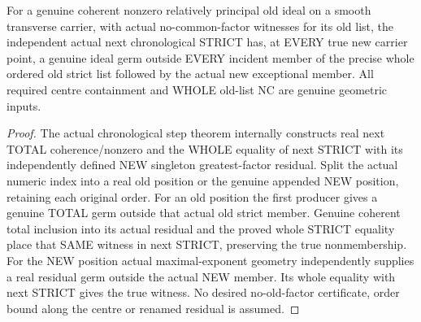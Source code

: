 \begin{theorem}
\label{hir:sharp-actual-next-strict-no-accumulated-member-factor}
\leanok
For a genuine coherent nonzero relatively principal old ideal on a smooth
transverse carrier, with actual no-common-factor witnesses for its old list,
the independent actual next chronological STRICT has, at EVERY true new
carrier point, a genuine ideal germ outside EVERY incident member of the
precise whole ordered old strict list followed by the actual new exceptional
member. All required centre containment and WHOLE old-list NC are genuine
geometric inputs.
\end{theorem}
\begin{proof}
The actual chronological step theorem internally constructs real next TOTAL
coherence/nonzero and the WHOLE equality of next STRICT with its independently
defined NEW singleton greatest-factor residual. Split the actual numeric
index into a real old position or the genuine appended NEW position, retaining
each original order. For an old position the first producer gives a genuine
TOTAL germ outside that actual old strict member. Genuine coherent total
inclusion into its actual residual and the proved whole STRICT equality place
that SAME witness in next STRICT, preserving the true nonmembership.
For the NEW position actual maximal-exponent geometry independently supplies
a real residual germ outside the actual NEW member. Its whole equality with
next STRICT gives the true witness. No desired no-old-factor certificate,
order bound along the centre or renamed residual is assumed.
\end{proof}

